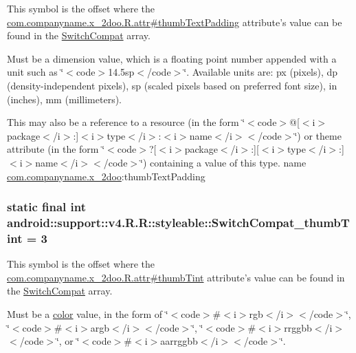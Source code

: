 This symbol is the offset where the \hyperlink{classcom_1_1companyname_1_1x__2doo_1_1_r_1_1attr_319bea80a72e815d2f7105ebe93e1ac0}{com.companyname.x\_\-2doo.R.attr\#thumbTextPadding} attribute's value can be found in the \hyperlink{classandroid_1_1support_1_1v4_1_1_r_1_1styleable_276d9c1ec80821a3e0fcdaa41daa75a0}{SwitchCompat} array.

Must be a dimension value, which is a floating point number appended with a unit such as \char`\"{}$<$code$>$14.5sp$<$/code$>$\char`\"{}. Available units are: px (pixels), dp (density-independent pixels), sp (scaled pixels based on preferred font size), in (inches), mm (millimeters). 

This may also be a reference to a resource (in the form \char`\"{}$<$code$>$@\mbox{[}$<$i$>$package$<$/i$>$:\mbox{]}$<$i$>$type$<$/i$>$:$<$i$>$name$<$/i$>$$<$/code$>$\char`\"{}) or theme attribute (in the form \char`\"{}$<$code$>$?\mbox{[}$<$i$>$package$<$/i$>$:\mbox{]}\mbox{[}$<$i$>$type$<$/i$>$:\mbox{]}$<$i$>$name$<$/i$>$$<$/code$>$\char`\"{}) containing a value of this type.  name \hyperlink{namespacecom_1_1companyname_1_1x__2doo}{com.companyname.x\_\-2doo}:thumbTextPadding \hypertarget{classandroid_1_1support_1_1v4_1_1_r_1_1styleable_136537e09affe833ba67adc81baf4df6}{
\subsubsection[{SwitchCompat\_\-thumbTint}]{\setlength{\rightskip}{0pt plus 5cm}static final int android::support::v4.R.R::styleable::SwitchCompat\_\-thumbTint = 3}}
\label{classandroid_1_1support_1_1v4_1_1_r_1_1styleable_136537e09affe833ba67adc81baf4df6}


This symbol is the offset where the \hyperlink{classcom_1_1companyname_1_1x__2doo_1_1_r_1_1attr_5ff50a30d9f3d2beb618a6e0700b7ab7}{com.companyname.x\_\-2doo.R.attr\#thumbTint} attribute's value can be found in the \hyperlink{classandroid_1_1support_1_1v4_1_1_r_1_1styleable_276d9c1ec80821a3e0fcdaa41daa75a0}{SwitchCompat} array.

Must be a \hyperlink{classandroid_1_1support_1_1v4_1_1_r_1_1color}{color} value, in the form of \char`\"{}$<$code$>$\#$<$i$>$rgb$<$/i$>$$<$/code$>$\char`\"{}, \char`\"{}$<$code$>$\#$<$i$>$argb$<$/i$>$$<$/code$>$\char`\"{}, \char`\"{}$<$code$>$\#$<$i$>$rrggbb$<$/i$>$$<$/code$>$\char`\"{}, or \char`\"{}$<$code$>$\#$<$i$>$aarrggbb$<$/i$>$$<$/code$>$\char`\"{}. 

